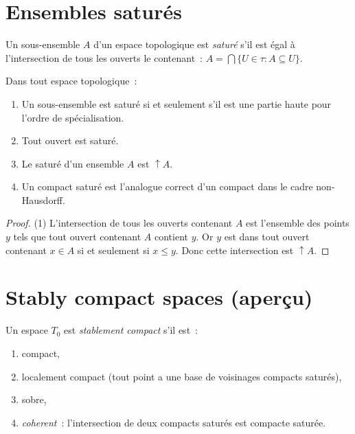 \section{Ensembles satur\'es}

\begin{definition}
Un sous-ensemble $A$ d'un espace topologique est \emph{satur\'e} s'il est \'egal \`a
l'intersection de tous les ouverts le contenant~:
$A = \bigcap\{U \in \tau : A \subseteq U\}$.
\end{definition}

\begin{proposition}
Dans tout espace topologique~:
\begin{enumerate}
  \item Un sous-ensemble est satur\'e si et seulement s'il est une partie haute pour
    l'ordre de sp\'ecialisation.
  \item Tout ouvert est satur\'e.
  \item Le satur\'e d'un ensemble $A$ est $\uparrow\! A$.
  \item Un compact satur\'e est l'analogue correct d'un compact dans le cadre non-Hausdorff.
\end{enumerate}
\end{proposition}

\begin{proof}
(1) L'intersection de tous les ouverts contenant $A$ est l'ensemble des points $y$ tels
que tout ouvert contenant $A$ contient $y$. Or $y$ est dans tout ouvert contenant $x \in A$
si et seulement si $x \leq y$. Donc cette intersection est $\uparrow\! A$.
\end{proof}

\section{Stably compact spaces (aper\c{c}u)}

\begin{definition}
Un espace $T_0$ est \emph{stablement compact} s'il est~:
\begin{enumerate}
  \item compact,
  \item localement compact (tout point a une base de voisinages compacts satur\'es),
  \item sobre,
  \item \emph{coherent}~: l'intersection de deux compacts satur\'es est compacte satur\'ee.
\end{enumerate}
\end{definition}

